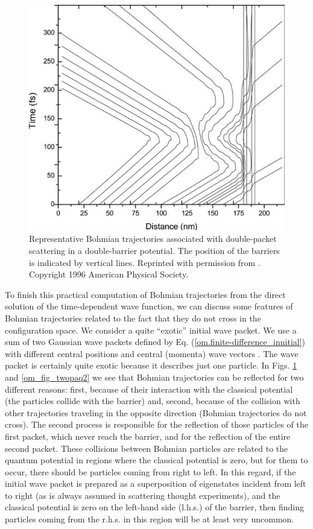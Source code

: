 \documentclass[nofootinbib, secnumarabic, amsmath, nobibnotes,11pt,aps,pra, floatfix]{revtex4-1}
\newcommand{\eref}[1]{Eq. (\ref{#1})}
\begin{document}
\begin{figure}
\centering
\includegraphics{F1_A1.pdf}
\caption{Representative Bohmian trajectories associated with double-packet scattering in a double-barrier potential. The position of the barriers is indicated by vertical lines. Reprinted with permission from \cite{om.oriolstime}. Copyright 1996 American Physical Society.}
\label{om_fig_twopaq1}
\end{figure}

To finish this practical computation of Bohmian trajectories from
the direct solution of the time-dependent wave function, we can
discuss some features of Bohmian trajectories related to the fact
that they do not cross in the configuration space. We consider a
quite ``exotic'' initial wave packet. We use a sum of two Gaussian
wave packets defined by \eref{om.finite-difference_innitial} with different central
positions and central (momenta) wave vectors \cite{om.oriolstime}.
The wave packet is certainly quite exotic because it describes just
one particle. In Figs. \ref{om_fig_twopaq1} and \ref{om_fig_twopaq2} we
see that Bohmian trajectories can be reflected for two different
reasons: first, because of their interaction with the classical
potential (the particles collide with the barrier) and, second,
because of the collision with other trajectories traveling in the
opposite direction (Bohmian trajectories do not cross). The second
process is responsible for the reflection of those particles of the
first packet, which never reach the barrier, and for the reflection
of the entire second packet. These collisions between Bohmian
particles are related to the quantum  potential
in regions where the classical potential is zero, but for them to
occur, there should be particles coming from right to left. In this
regard, if the initial wave packet is prepared as a superposition of
eigenstates incident from left to right (as is always assumed in
scattering thought experiments), and the classical potential is zero
on the left-hand side (l.h.s.) of the barrier, then finding
particles coming from the r.h.s. in this region will be at least
very uncommon.
\end{document}
